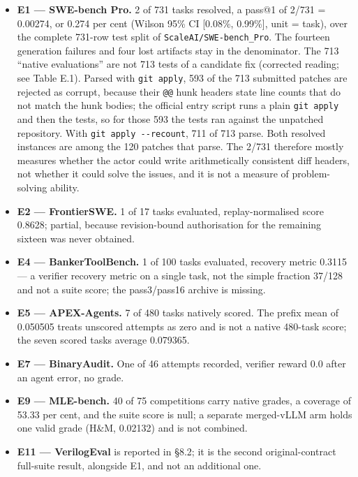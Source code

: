 \documentclass[12pt,a4paper]{report}
\providecommand{\tightlist}{%
  \setlength{\itemsep}{0pt}\setlength{\parskip}{0pt}}
\begin{document}
\begin{itemize}
\tightlist
\item
  \textbf{E1 --- SWE-bench Pro.} 2 of 731 tasks resolved, a pass@1 of
  2/731 = 0.00274, or 0.274 per cent (Wilson 95\% CI {[}0.08\%,
  0.99\%{]}, unit = task), over the complete 731-row test split of
  \texttt{ScaleAI/SWE-bench\_Pro}. The fourteen generation failures and
  four lost artifacts stay in the denominator. The 713 ``native
  evaluations'' are not 713 tests of a candidate fix (corrected reading;
  see Table E.1). Parsed with \texttt{git\ apply}, 593 of the 713
  submitted patches are rejected as corrupt, because their \texttt{@@}
  hunk headers state line counts that do not match the hunk bodies; the
  official entry script runs a plain \texttt{git\ apply} and then the
  tests, so for those 593 the tests ran against the unpatched
  repository. With \texttt{git\ apply\ -\/-recount}, 711 of 713 parse.
  Both resolved instances are among the 120 patches that parse. The
  2/731 therefore mostly measures whether the actor could write
  arithmetically consistent diff headers, not whether it could solve the
  issues, and it is not a measure of problem-solving ability.
\item
  \textbf{E2 --- FrontierSWE.} 1 of 17 tasks evaluated,
  replay-normalised score 0.8628; partial, because revision-bound
  authorisation for the remaining sixteen was never obtained.
\item
  \textbf{E4 --- BankerToolBench.} 1 of 100 tasks evaluated, recovery
  metric 0.3115 --- a verifier recovery metric on a single task, not the
  simple fraction 37/128 and not a suite score; the pass3/pass16 archive
  is missing.
\item
  \textbf{E5 --- APEX-Agents.} 7 of 480 tasks natively scored. The
  prefix mean of 0.050505 treats unscored attempts as zero and is not a
  native 480-task score; the seven scored tasks average 0.079365.
\item
  \textbf{E7 --- BinaryAudit.} One of 46 attempts recorded, verifier
  reward 0.0 after an agent error, no grade.
\item
  \textbf{E9 --- MLE-bench.} 40 of 75 competitions carry native grades,
  a coverage of 53.33 per cent, and the suite score is null; a separate
  merged-vLLM arm holds one valid grade (H\&M, 0.02132) and is not
  combined.
\item
  \textbf{E11 --- VerilogEval} is reported in §8.2; it is the second
  original-contract full-suite result, alongside E1, and not an
  additional one.
\end{itemize}
\end{document}
